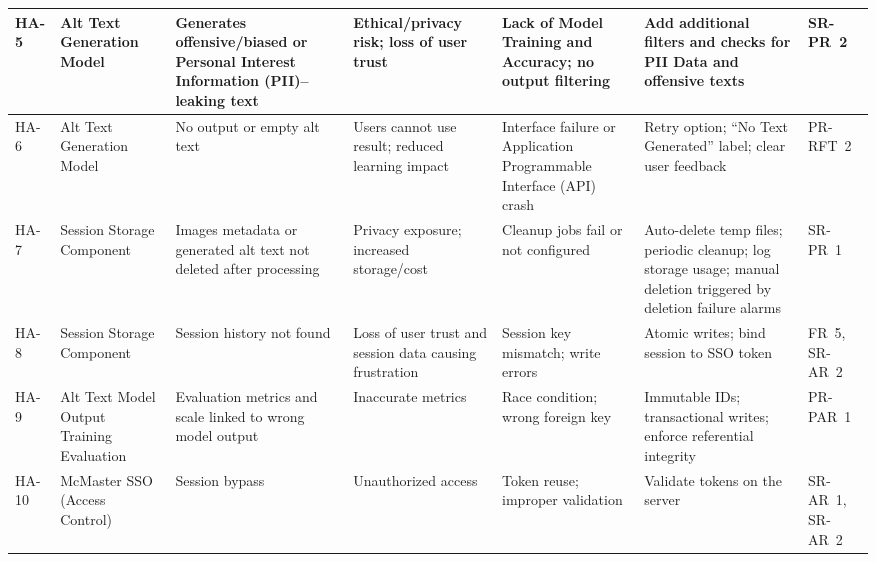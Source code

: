 \documentclass{article}
\begin{document}
\begin{landscape}
\begin{longtable}{|p{1.2cm}|p{2.0cm}|p{3.0cm}|p{3.2cm}|p{3.2cm}|p{4.0cm}|p{2.6cm}|}
    HA-5 & Alt Text Generation Model &
    Generates offensive/biased or Personal Interest Information (PII)–leaking text &
    Ethical/privacy risk; loss of user trust &
    Lack of Model Training and Accuracy; no output filtering &
    Add additional filters and checks for PII Data and offensive texts &
    SR-PR~2 \\ \hline
    
    HA-6 & Alt Text Generation Model &
    No output or empty alt text &
    Users cannot use result; reduced learning impact &
    Interface failure or Application Programmable Interface (API) crash &
    Retry option; “No Text Generated” label; clear user feedback &
    PR-RFT~2 \\ \hline
    
    HA-7 & Session Storage Component &
    Images metadata or generated alt text not deleted after processing &
    Privacy exposure; increased storage/cost &
    Cleanup jobs fail or not configured &
    Auto-delete temp files; periodic cleanup; log storage usage; manual deletion triggered by deletion failure alarms &
    SR-PR~1 \\ \hline
    
    HA-8 & Session Storage Component &
    Session history not found &
    Loss of user trust and session data causing frustration &
    Session key mismatch; write errors &
    Atomic writes; bind session to SSO token &
    FR~5, SR-AR~2 \\ \hline
    
    HA-9 & Alt Text Model Output Training Evaluation &
    Evaluation metrics and scale linked to wrong model output &
    Inaccurate metrics &
    Race condition; wrong foreign key &
    Immutable IDs; transactional writes; enforce referential integrity &
    PR-PAR~1 \\ \hline
    
    HA-10 & McMaster SSO (Access Control) &
    Session bypass &
    Unauthorized access &
    Token reuse; improper validation &
    Validate tokens on the server &
    SR-AR~1, SR-AR~2 \\ \hline

    \end{longtable}
    
\end{landscape}
    
    
\end{document}

